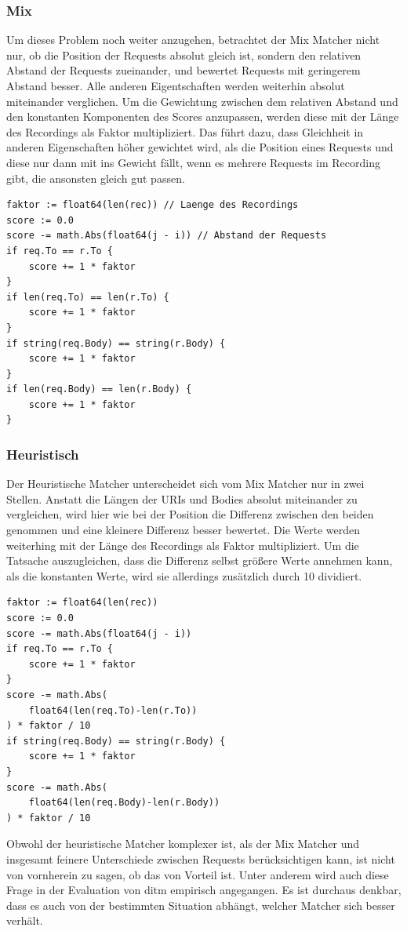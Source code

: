 \documentclass[12pt,a4paper]{report}
\begin{document}
\subsubsection{Mix}
Um dieses Problem noch weiter anzugehen, betrachtet der Mix Matcher nicht nur, ob die Position der Requests absolut gleich
ist, sondern den relativen Abstand der Requests zueinander, und bewertet Requests mit geringerem Abstand besser. Alle
anderen Eigentschaften werden weiterhin absolut miteinander verglichen. Um die Gewichtung zwischen dem relativen Abstand
und den konstanten Komponenten des Scores anzupassen, werden diese mit der Länge des Recordings als Faktor multipliziert.
Das führt dazu, dass Gleichheit in anderen Eigenschaften höher gewichtet wird, als die Position eines Requests und diese
nur dann mit ins Gewicht fällt, wenn es mehrere Requests im Recording gibt, die ansonsten gleich gut passen.
\begin{lstlisting}
faktor := float64(len(rec)) // Laenge des Recordings
score := 0.0
score -= math.Abs(float64(j - i)) // Abstand der Requests
if req.To == r.To {
    score += 1 * faktor
}
if len(req.To) == len(r.To) {
    score += 1 * faktor
}
if string(req.Body) == string(r.Body) {
    score += 1 * faktor
}
if len(req.Body) == len(r.Body) {
    score += 1 * faktor
}
\end{lstlisting}

\subsubsection{Heuristisch}
Der Heuristische Matcher unterscheidet sich vom Mix Matcher nur in zwei Stellen. Anstatt die Längen der URIs und Bodies
absolut miteinander zu vergleichen, wird hier wie bei der Position die Differenz zwischen den beiden genommen und eine kleinere
Differenz besser bewertet. Die Werte werden weiterhing mit der Länge des Recordings als Faktor multipliziert. Um die Tatsache
auszugleichen, dass die Differenz selbst größere Werte annehmen kann, als die konstanten Werte, wird sie allerdings zusätzlich
durch 10 dividiert.
\begin{lstlisting}
faktor := float64(len(rec))
score := 0.0
score -= math.Abs(float64(j - i))
if req.To == r.To {
    score += 1 * faktor
}
score -= math.Abs(
    float64(len(req.To)-len(r.To))
) * faktor / 10
if string(req.Body) == string(r.Body) {
    score += 1 * faktor
}
score -= math.Abs(
    float64(len(req.Body)-len(r.Body))
) * faktor / 10
\end{lstlisting}
Obwohl der heuristische Matcher komplexer ist, als der Mix Matcher und insgesamt feinere Unterschiede zwischen Requests
berücksichtigen kann, ist nicht von vornherein zu sagen, ob das von Vorteil ist. Unter anderem wird auch diese Frage in
der Evaluation von ditm empirisch angegangen. Es ist durchaus denkbar, dass es auch von der bestimmten Situation abhängt,
welcher Matcher sich besser verhält.
\end{document}
